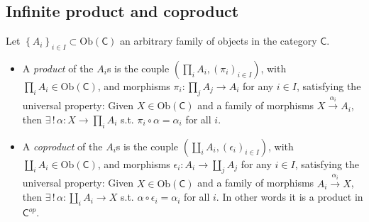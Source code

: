 \subsection{Infinite product and coproduct}

\begin{defn}
	Let $\left\{ A_i \right\}_{i \in I} \subset \mathrm{Ob} \left(\mathsf{C}\right)$ an arbitrary family of objects in the category $\mathsf{C}$.
	 \begin{itemize}
		 \item A {\em product} of the $A_i$s is the couple $\left(\prod_i A_i, (\pi_i)_{i \in I} \right)$, with $\prod_i A_i \in \mathrm{Ob} \left(\mathsf{C}\right)$, and morphisms $\pi_i: \prod_j A_j \to A_i$ for any $i \in I$, satisfying the universal property:
			 Given $X \in \mathrm{Ob} \left(\mathsf{C}\right)$ and a family of morphisms $X \xrightarrow{\alpha_i} A_i$, then $\exists\, !\, \alpha: X \to \prod_i A_i$ s.t. $\pi_i \circ \alpha = \alpha_i$ for all $i$.
		 \item A {\em coproduct} of the $A_i$s is the couple $\left(\coprod_i A_i, (\epsilon_i)_{i \in I} \right)$, with $\coprod_i A_i \in \mathrm{Ob} \left(\mathsf{C}\right)$, and morphisms $\epsilon_i: A_i \to \coprod_j A_j$ for any $i \in I$, satisfying the universal property:
			 Given $X \in \mathrm{Ob} \left(\mathsf{C}\right)$ and a family of morphisms $A_i \xrightarrow{\alpha_i} X$, then $\exists\, !\, \alpha: \coprod_i A_i \to X$ s.t. $\alpha \circ \epsilon_i = \alpha_i$ for all $i$.
			 In other words it is a product in $\mathsf{C}^{op}$.
	\end{itemize}
\end{defn}
 
